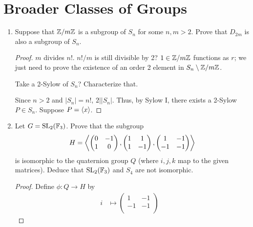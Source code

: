 \documentclass[../psets.tex]{subfiles}
\begin{document}
\section{Broader Classes of Groups}
\begin{enumerate}
    \item {}Suppose that $\mathbb{Z}/m\mathbb{Z}$ is a subgroup of $S_n$ for some $n,m>2$. Prove that $D_{2m}$ is also a subgroup of $S_n$.
    \begin{proof}
        $m$ divides $n!$. $n!/m$ is still divisible by 2? $1\in\mathbb{Z}/m\mathbb{Z}$ functions as $r$; we just need to prove the existence of an order 2 element in $S_n\setminus\mathbb{Z}/m\mathbb{Z}$.

        Take a 2-Sylow of $S_n$? Characterize that.


        Since $n>2$ and $|S_n|=n!$, $2\big||S_n|$. Thus, by Sylow I, there exists a 2-Sylow $P\in S_n$. Suppose $P=\left\langle{x}\right\rangle$.
    \end{proof}
    \item Let $G=\text{SL}_2(\mathbb{F}_3)$. Prove that the subgroup
    \begin{equation*}
        H = \left\langle{
            \begin{pmatrix}
                0 & -1\\
                1 & 0\\
            \end{pmatrix},
            \begin{pmatrix}
                1 & 1\\
                1 & -1\\
            \end{pmatrix},
            \begin{pmatrix}
                1 & -1\\
                -1 & -1\\
            \end{pmatrix}
        }\right\rangle
    \end{equation*}
    is isomorphic to the quaternion group $Q$ (where $i,j,k$ map to the given matrices). Deduce that $\text{SL}_2(\mathbb{F}_3)$ and $S_4$ are not isomorphic.
    \begin{proof}
        Define $\phi:Q\to H$ by
        \begin{align*}
            i &\mapsto
            \begin{pmatrix}
                1 & -1\\
                -1 & -1\\
            \end{pmatrix}&

\end{align*}
\end{proof}
\end{enumerate}
\end{document}
